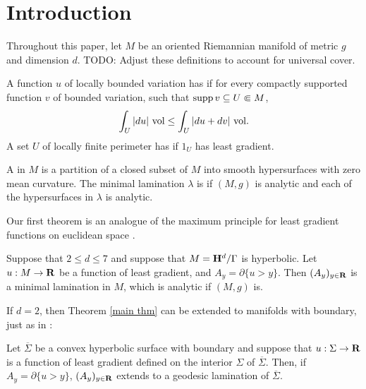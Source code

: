 \section{Introduction}
Throughout this paper, let $M$ be an oriented Riemannian manifold of metric $g$ and dimension $d$.
TODO: Adjust these definitions to account for universal cover.

\begin{definition}\label{main definitions}
A function $u$ of locally bounded variation has  if for every compactly supported function $v$ of bounded variation, such that $\operatorname{supp} v \subseteq U \Subset M$,
$$\int_U |du| ~\mathrm{vol} \leq \int_U |du + dv| ~\mathrm{vol}.$$
A set $U$ of locally finite perimeter has  if $1_U$ has least gradient.
\end{definition}

\begin{definition}
A  in $M$ is a partition of a closed subset of $M$ into smooth hypersurfaces with zero mean curvature.
The minimal lamination $\lambda$ is  if $(M, g)$ is analytic and each of the hypersurfaces in $\lambda$ is analytic.
\end{definition}

Our first theorem is an analogue of the maximum principle for least gradient functions on euclidean space \cite[Proposition 3.4]{górny2017planar}.

\begin{theorem}\label{main thm}
Suppose that $2 \leq d \leq 7$ and suppose that $M = \mathbf H^d/\Gamma$ is hyperbolic.
Let $u: M \to \mathbf{R}$ be a function of least gradient, and $A_y = \partial \{u > y\}$.
Then $(A_y)_{y \in \mathbf{R}}$ is a minimal lamination in $M$, which is analytic if $(M, g)$ is.
\end{theorem}

If $d = 2$, then Theorem \ref{main thm} can be extended to manifolds with boundary, just as in \cite[Corollary 3.5]{górny2017planar}:

\begin{theorem}\label{main crly}
Let $\overline \Sigma$ be a convex hyperbolic surface with boundary and suppose that $u: \Sigma \to \mathbf{R}$ is a function of least gradient defined on the interior $\Sigma$ of $\overline \Sigma$.
Then, if $A_y = \partial \{u > y\}$, $(A_y)_{y \in \mathbf{R}}$ extends to a geodesic lamination of $\overline \Sigma$.
\end{theorem}

